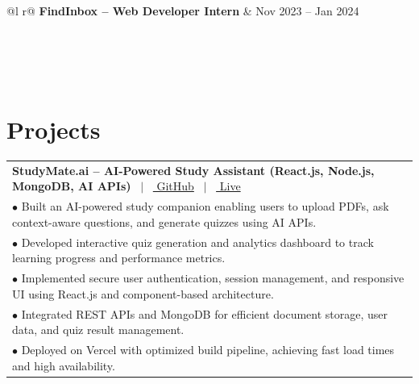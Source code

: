 \documentclass[a4paper,11pt]{article}
\begin{document}
\begin{tabularx}{\linewidth}{@{}l r@{}}
\textbf{FindInbox -- Web Developer Intern} & Nov 2023 -- Jan 2024 \\[2pt]
 \\
 \\
 \\
 \\
\end{tabularx}

\section{Projects}

\begin{tabularx}{\linewidth}{@{}X@{}}
\textbf{StudyMate.ai -- AI-Powered Study Assistant (React.js, Node.js, MongoDB, AI APIs)} \ $|$ \
\href{https://github.com/Shilpa2504}{ GitHub} \ $|$ \
\href{https://study-mate-ai-six.vercel.app/login}{ Live} \\[2pt]
{$\bullet$ Built an AI-powered study companion enabling users to upload PDFs, ask context-aware questions, and generate quizzes using AI APIs.} \\
{$\bullet$ Developed interactive quiz generation and analytics dashboard to track learning progress and performance metrics.} \\
{$\bullet$ Implemented secure user authentication, session management, and responsive UI using React.js and component-based architecture.} \\
{$\bullet$ Integrated REST APIs and MongoDB for efficient document storage, user data, and quiz result management.} \\
{$\bullet$ Deployed on Vercel with optimized build pipeline, achieving fast load times and high availability.} \\
\end{tabularx}
\end{document}
